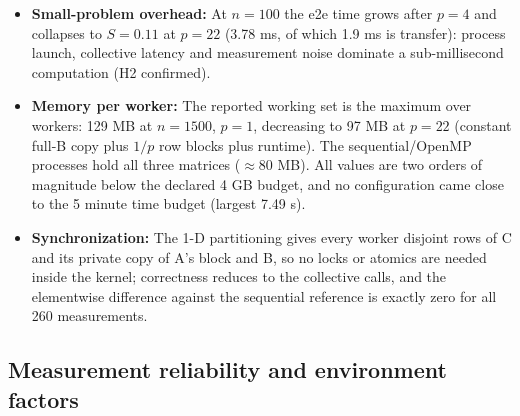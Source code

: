\documentclass[12pt,a4paper]{article}
\begin{document}
\begin{itemize}
$1.45\times$ single-process advantage over the row-pointer OpenMP kernel,
which outweighs the collective cost of the tested counts. Both effects are
consistent with H3 and with the measurements; they are properties of this
machine and these sizes, not a general ranking of the frameworks.
\item \textbf{Small-problem overhead:} At $n = 100$ the e2e time grows
after $p = 4$ and collapses to $S = 0.11$ at $p = 22$ (3.78 ms, of which
1.9 ms is transfer): process launch, collective latency and measurement
noise dominate a sub-millisecond computation (H2 confirmed).
\item \textbf{Memory per worker:} The reported working set is the maximum
over workers: 129 MB at $n = 1500$, $p = 1$, decreasing to 97 MB at
$p = 22$ (constant full-B copy plus $1/p$ row blocks plus runtime). The
sequential/OpenMP processes hold all three matrices ($\approx$80 MB). All
values are two orders of magnitude below the declared 4 GB budget, and no
configuration came close to the 5 minute time budget (largest 7.49 s).
\item \textbf{Synchronization:} The 1-D partitioning gives every worker
disjoint rows of C and its private copy of A's block and B, so no locks or
atomics are needed inside the kernel; correctness reduces to the collective
calls, and the elementwise difference against the sequential reference is
exactly zero for all 260 measurements.
\end{itemize}

\subsection{Measurement reliability and environment factors}
\label{sec:reliability}
\end{document}
